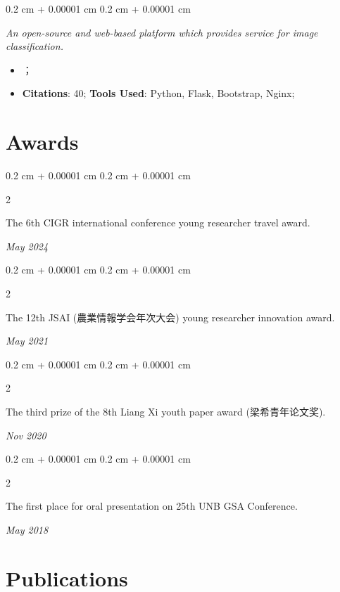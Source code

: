 \documentclass[10pt, a4paper]{article}
\newcommand{\textchinese}[1]{{\CJKfamily{chinese}#1}}
\newenvironment{highlights}{
    \begin{itemize}[
        topsep=0.10 cm,
        parsep=0.10 cm,
        partopsep=0pt,
        itemsep=0pt,
        leftmargin=0.4 cm + 10pt
    ]
}{
    \end{itemize}
} %
\newenvironment{onecolentry}{
    \begin{adjustwidth}{
        0.2 cm + 0.00001 cm
    }{
        0.2 cm + 0.00001 cm
    }
}{
    \end{adjustwidth}
} %
\newenvironment{twocolentry}[2][]{
    \onecolentry
    \def\secondColumn{#2}
    \setcolumnwidth{\fill, 4.5 cm}
    \begin{paracol}{2}
}{
    \switchcolumn \raggedleft \secondColumn
    \end{paracol}
    \endonecolentry
} %
\begin{document}
        \vspace{0.10 cm}
        \begin{onecolentry}
            \textit{An open-source and web-based platform which provides service for image classification.}
            
            \begin{highlights}
                \item {}；
                \item \textbf{Citations}: 40; \textbf{Tools Used}: Python, Flask, Bootstrap, Nginx; 
            \end{highlights}
        \end{onecolentry}

    \section{Awards}

        \begin{twocolentry}{
            \textit{May 2024}}
            The 6th CIGR international conference young researcher travel award.
        \end{twocolentry}

        \vspace{0.10 cm}

        \begin{twocolentry}{
            \textit{May 2021}}
            The 12th JSAI (農業情報学会年次大会) young researcher innovation award.
        \end{twocolentry}

        \vspace{0.10 cm}

        \begin{twocolentry}{
            \textit{Nov 2020}}
            The third prize of the 8th Liang Xi youth paper award (\textchinese{梁希青年论文奖}).
        \end{twocolentry}
        
        \vspace{0.10 cm}

        \begin{twocolentry}{
            \textit{May 2018}}
            The first place for oral presentation on 25th UNB GSA Conference.
        \end{twocolentry}
        
    
    \section{Publications}
        \nocite{*}
\end{document}
